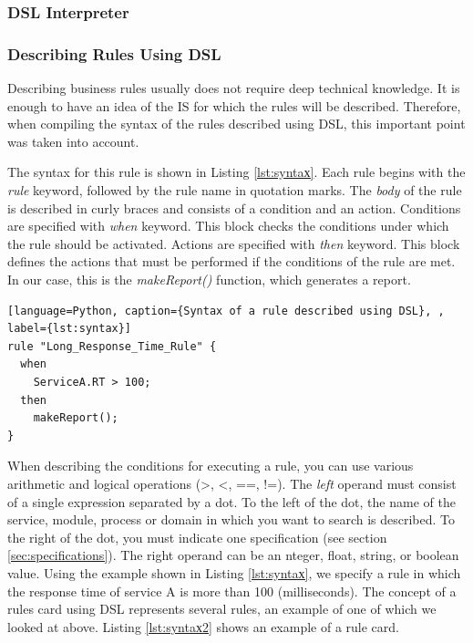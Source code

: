 \documentclass[12pt, times]{article}
\begin{document}
	\subsubsection{DSL Interpreter}
	\label{sec:dsl-translator}
	
	\subsubsection*{Describing Rules Using DSL}
	
	\hspace*{5mm} Describing business rules usually does not require deep technical knowledge. It is enough to have an idea of the IS for which the rules will be described. Therefore, when compiling the syntax of the rules described using DSL, this important point was taken into account. 
	
	\hspace*{5mm}The syntax for this rule is shown in Listing \ref{lst:syntaх}. Each rule begins with the \textit{rule} keyword, followed by the rule name in quotation marks. The \textit{body} of the rule is described in curly braces and consists of a condition and an action. Conditions are specified with \textit{when} keyword. This block checks the conditions under which the rule should be activated. Actions are specified with \textit{then} keyword. This block defines the actions that must be performed if the conditions of the rule are met. In our case, this is the \textit{makeReport()} function, which generates a report.
	
	
	\begin{lstlisting}[language=Python, caption={Syntax of a rule described using DSL}, , label={lst:syntaх}]
rule "Long_Response_Time_Rule" {
  when
    ServiceA.RT > 100;
  then
    makeReport();
}
	\end{lstlisting}
	
\hspace*{5mm} When describing the conditions for executing a rule, you can use various arithmetic and logical operations (>, <, ==, !=). The \textit{left} operand must consist of a single expression separated by a dot. To the left of the dot, the name of the service, module, process or domain in which you want to search is described. To the right of the dot, you must indicate one specification (see section \ref{sec:specifications}). The right operand can be an nteger, float, string, or boolean value. Using the example shown in Listing \ref{lst:syntaх}, we specify a rule in which the response time of service A is more than 100 (milliseconds). The concept of a rules card using DSL represents several rules, an example of one of which we looked at above. Listing \ref{lst:syntaх2} shows an example of a rule card.
\end{document}
